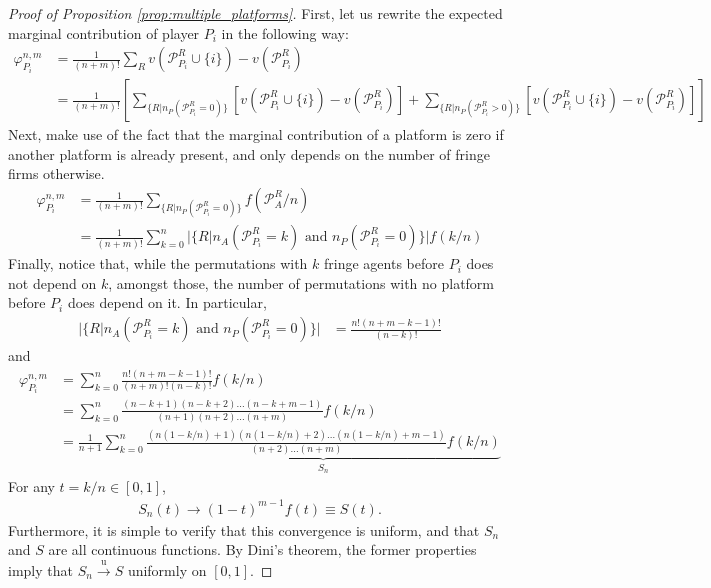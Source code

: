 \documentclass[a4paper]{article}
\begin{document}
\begin{proof}[Proof of Proposition \ref{prop:multiple_platforms}]
    \label{prop:one_sided_multiple}
    First, let us rewrite the expected marginal contribution of player $P_i$ in the following way:
    \begin{align*}
        \varphi_{P_i}^{n, m} &= \frac{1}{(n+m)!} \sum_R v(\mathcal{P}_{P_i}^R \cup \{i\}) - v(\mathcal{P}_{P_i}^R) \\
        &= \frac{1}{(n+m)!} \left[ \sum_{\{R | n_P(\mathcal{P}_{P_i}^R = 0)\}} \left[v(\mathcal{P}_{P_i}^R \cup \{i\}) - v(\mathcal{P}_{P_i}^R)\right] + \sum_{\{R | n_P(\mathcal{P}_{P_i}^R > 0)\}} \left[v(\mathcal{P}_{P_i}^R \cup \{i\}) - v(\mathcal{P}_{P_i}^R)\right] \right]
    \end{align*}
    Next, make use of the fact that the marginal contribution of a platform is zero if another platform is already present, and only depends on the number of fringe firms otherwise.
    \begin{align*}
        \varphi_{P_i}^{n, m} &= \frac{1}{(n+m)!} \sum_{\{R | n_P(\mathcal{P}_{P_i}^R = 0)\}} f (\mathcal{P}_{A}^R / n) \\
        &= \frac{1}{(n+m)!} \sum_{k=0}^n |\{R | n_A(\mathcal{P}^R_{P_i} = k) \text{ and } n_P(\mathcal{P}^R_{P_i} = 0)\}| f(k/n)
    \end{align*}
    Finally, notice that, while the permutations with $k$ fringe agents before $P_i$ does not depend on $k$, amongst those, the number of permutations with no platform before $P_i$ does depend on it.
    In particular,
    \begin{align*}
        |\{R | n_A(\mathcal{P}^R_{P_i} = k) \text{ and } n_P(\mathcal{P}^R_{P_i} = 0)\}| &= \frac{n!(n+m-k-1)!}{(n-k)!}
    \end{align*}
    and
    \begin{align*}
        \varphi_{P_i}^{n, m} &= \sum_{k=0}^n \frac{n!(n+m-k-1)!}{(n+m)!(n-k)!} f(k/n) \\
        &= \sum_{k=0}^n \frac{(n-k+1)(n-k+2) \dots (n-k+m-1)}{(n+1)(n+2) \dots (n+m)} f(k/n) \\
        &= \frac{1}{n+1}\sum_{k=0}^n \underbrace{\frac{(n(1-k/n)+1)(n(1-k/n)+2) \dots (n(1-k/n)+m-1)}{(n+2) \dots (n+m)} f(k/n)}_{S_n}
    \end{align*}
    For any $t = k/n \in [0, 1]$, 
    \begin{align*}
        S_n(t) \to (1-t)^{m-1}f(t) \equiv S(t).
    \end{align*}
    Furthermore, it is simple to verify that this convergence is uniform, and that $S_n$ and $S$ are all continuous functions.
    By Dini's theorem, the former properties imply that $S_n \xrightarrow[]{\mathrm{u}} S$ uniformly on $[0, 1]$.


\end{proof}
\end{document}
